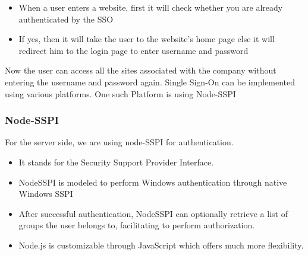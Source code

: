 \documentclass{report}
\begin{document}
\begin{itemize}
	\item{When a user enters a website, first it will check whether you are already authenticated by the SSO}
	\item{If yes, then it will take the user to the website’s home page else it will redirect him to the login page to enter username and password}
\end{itemize}
Now the user can access all the sites associated with the company without entering the username and password again.
Single Sign-On can be implemented using various platforms.
One such Platform is using Node-SSPI
\subsubsection*{Node-SSPI}
For the server side, we are using node-SSPI for authentication.
\begin{itemize}
	\item{It stands for the Security Support Provider Interface.}
	\item{NodeSSPI is modeled to perform Windows authentication through native Windows SSPI}
	\item{After successful authentication, NodeSSPI can optionally retrieve a list of groups the user belongs to, facilitating to perform authorization.}
	\item{Node.js is customizable through JavaScript which offers much more flexibility.}
\end{itemize}
\end{document}
